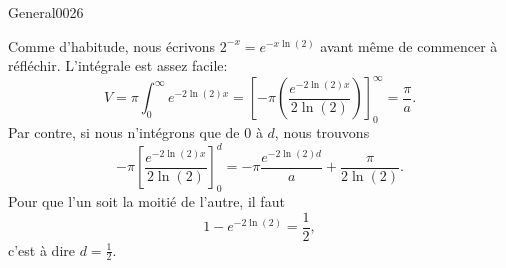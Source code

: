 \begin{corrige}{General0026}

Comme d'habitude, nous écrivons $2^{-x}= e^{-x\ln(2)}$ avant même de commencer à réfléchir. L'intégrale est assez facile:
\begin{equation}
	V=\pi\int_0^{\infty} e^{-2\ln(2)x}=\left[ -\pi\left(  \frac{  e^{-2\ln(2)x} }{ 2\ln(2) } \right) \right]_0^{\infty}=\frac{ \pi }{ a }.
\end{equation}
Par contre, si nous n'intégrons que de $0$ à $d$, nous trouvons
\begin{equation}
	-\pi\left[ \frac{  e^{-2\ln(2)x} }{ 2\ln(2) } \right]_0^d=-\pi\frac{  e^{-2\ln(2)d} }{ a }+\frac{ \pi }{ 2\ln(2) }.
\end{equation}
Pour que l'un soit la moitié de l'autre, il faut
\begin{equation}
	1- e^{-2\ln(2)}=\frac{ 1 }{2},
\end{equation}
c'est à dire $d=\frac{1}{ 2 }$.

\end{corrige}
